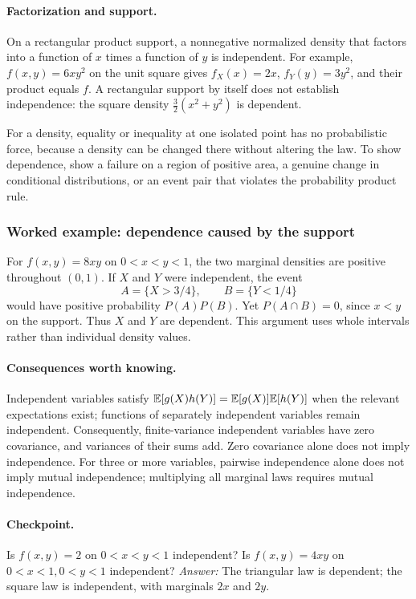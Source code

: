\paragraph{Factorization and support.} On a rectangular product support, a nonnegative normalized density that factors into a function of $x$ times a function of $y$ is independent. For example, $f(x,y)=6xy^2$ on the unit square gives $f_X(x)=2x$, $f_Y(y)=3y^2$, and their product equals $f$. A rectangular support by itself does not establish independence: the square density $\tfrac32(x^2+y^2)$ is dependent.

For a density, equality or inequality at one isolated point has no probabilistic force, because a density can be changed there without altering the law. To show dependence, show a failure on a region of positive area, a genuine change in conditional distributions, or an event pair that violates the probability product rule.

\subsubsection*{Worked example: dependence caused by the support}
For $f(x,y)=8xy$ on $0<x<y<1$, the two marginal densities are positive throughout $(0,1)$. If $X$ and $Y$ were independent, the event
\[
 A=\{X>3/4\},\qquad B=\{Y<1/4\}
\]
would have positive probability $P(A)P(B)$. Yet $P(A\cap B)=0$, since $x<y$ on the support. Thus $X$ and $Y$ are dependent. This argument uses whole intervals rather than individual density values.

\paragraph{Consequences worth knowing.} Independent variables satisfy $\mathbb E[g(X)h(Y)]=\mathbb E[g(X)]\mathbb E[h(Y)]$ when the relevant expectations exist; functions of separately independent variables remain independent. Consequently, finite-variance independent variables have zero covariance, and variances of their sums add. Zero covariance alone does not imply independence. For three or more variables, pairwise independence alone does not imply mutual independence; multiplying all marginal laws requires mutual independence.

\paragraph{Checkpoint.} Is $f(x,y)=2$ on $0<x<y<1$ independent? Is $f(x,y)=4xy$ on $0<x<1,0<y<1$ independent? \emph{Answer:} The triangular law is dependent; the square law is independent, with marginals $2x$ and $2y$.


